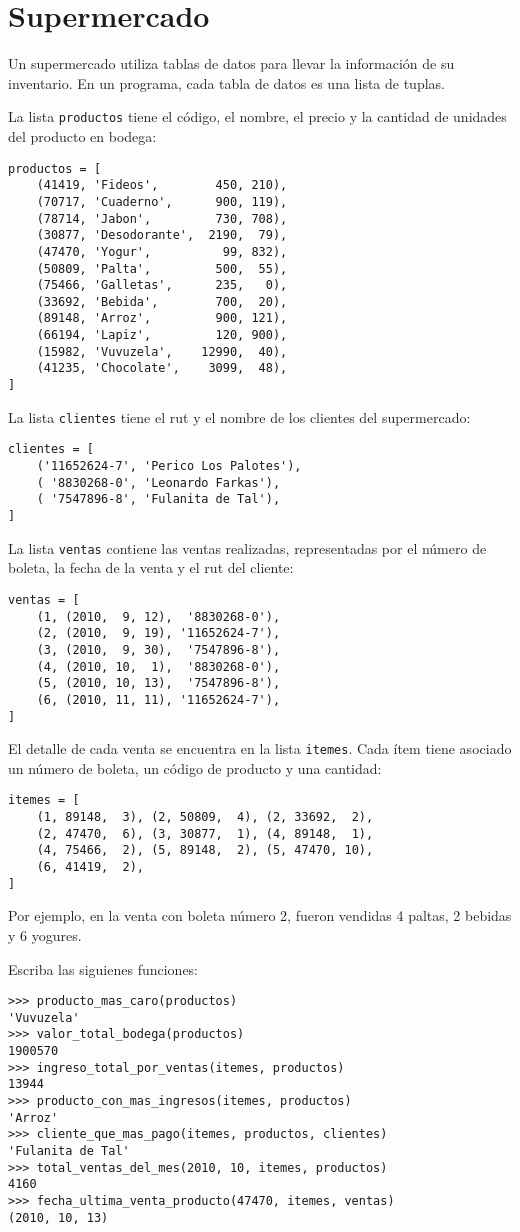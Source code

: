 \section{Supermercado}

Un supermercado utiliza tablas de datos para llevar la información de su
inventario.  En un programa, cada tabla de datos es una lista de tuplas.

La lista \lstinline!productos! tiene el código, el nombre, el precio y
la cantidad de unidades del producto en bodega:

\begin{lstlisting}
productos = [
    (41419, 'Fideos',        450, 210),
    (70717, 'Cuaderno',      900, 119),
    (78714, 'Jabon',         730, 708),
    (30877, 'Desodorante',  2190,  79),
    (47470, 'Yogur',          99, 832),
    (50809, 'Palta',         500,  55),
    (75466, 'Galletas',      235,   0),
    (33692, 'Bebida',        700,  20),
    (89148, 'Arroz',         900, 121),
    (66194, 'Lapiz',         120, 900),
    (15982, 'Vuvuzela',    12990,  40),
    (41235, 'Chocolate',    3099,  48),
]
\end{lstlisting}

La lista \lstinline!clientes! tiene el rut y el nombre de los clientes
del supermercado:
\begin{lstlisting}
clientes = [
    ('11652624-7', 'Perico Los Palotes'),
    ( '8830268-0', 'Leonardo Farkas'),
    ( '7547896-8', 'Fulanita de Tal'),
]
\end{lstlisting}

La lista \lstinline!ventas! contiene las ventas realizadas,
representadas por el número de boleta, la fecha de la venta y el rut del
cliente:
\begin{lstlisting}
ventas = [
    (1, (2010,  9, 12),  '8830268-0'),
    (2, (2010,  9, 19), '11652624-7'),
    (3, (2010,  9, 30),  '7547896-8'),
    (4, (2010, 10,  1),  '8830268-0'),
    (5, (2010, 10, 13),  '7547896-8'),
    (6, (2010, 11, 11), '11652624-7'),
]
\end{lstlisting}

El detalle de cada venta se encuentra en la lista \lstinline!itemes!.
Cada ítem tiene asociado un número de boleta, un código de producto y
una cantidad:
\begin{lstlisting}
itemes = [
    (1, 89148,  3), (2, 50809,  4), (2, 33692,  2),
    (2, 47470,  6), (3, 30877,  1), (4, 89148,  1),
    (4, 75466,  2), (5, 89148,  2), (5, 47470, 10),
    (6, 41419,  2),
]
\end{lstlisting}

Por ejemplo, en la venta con boleta número 2, fueron vendidas 4 paltas,
2 bebidas y 6 yogures.

Escriba las siguienes funciones:
\begin{lstlisting}
>>> producto_mas_caro(productos)
'Vuvuzela'
>>> valor_total_bodega(productos)
1900570
>>> ingreso_total_por_ventas(itemes, productos)
13944
>>> producto_con_mas_ingresos(itemes, productos)
'Arroz'
>>> cliente_que_mas_pago(itemes, productos, clientes)
'Fulanita de Tal'
>>> total_ventas_del_mes(2010, 10, itemes, productos)
4160
>>> fecha_ultima_venta_producto(47470, itemes, ventas)
(2010, 10, 13)
\end{lstlisting}


